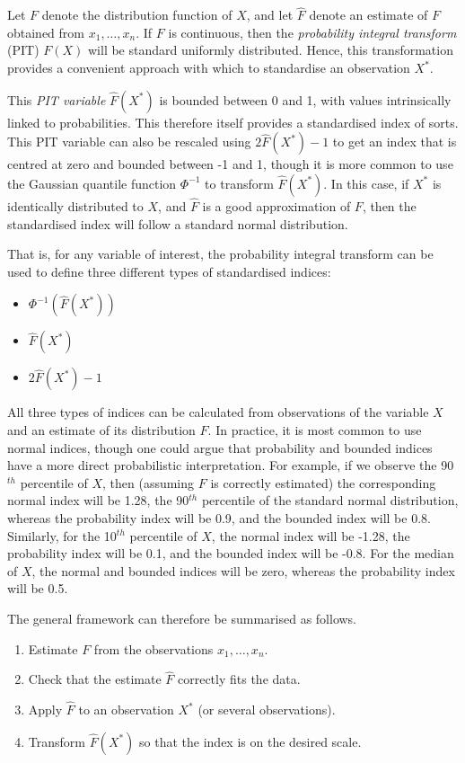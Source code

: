 \documentclass[article,shortnames,nojss]{jss}\usepackage[]{graphicx}\usepackage[]{xcolor}
\begin{document}
Let $F$ denote the distribution function of $X$, and let $\hat{F}$ denote an estimate of $F$ obtained from $x_{1}, \dots, x_{n}$. If $F$ is continuous, then the \emph{probability integral transform} (PIT) $F(X)$ will be standard uniformly distributed. Hence, this transformation provides a convenient approach with which to standardise an observation $X^{*}$.

This \emph{PIT variable} $\hat{F}(X^{*})$ is bounded between 0 and 1, with values intrinsically linked to probabilities. This therefore itself provides a standardised index of sorts. This PIT variable can also be rescaled using $2\hat{F}(X^{*}) - 1$ to get an index that is centred at zero and bounded between -1 and 1, though it is more common to use the Gaussian quantile function $\Phi^{-1}$ to transform $\hat{F}(X^{*})$. In this case, if $X^{*}$ is identically distributed to $X$, and $\hat{F}$ is a good approximation of $F$, then the standardised index will follow a standard normal distribution.

That is, for any variable of interest, the probability integral transform can be used to define three different types of standardised indices:
\begin{itemize}
  \item {} $\Phi^{-1}(\hat{F}(X^{*}))$
  \item {} $\hat{F}(X^{*})$
  \item {} $2\hat{F}(X^{*}) - 1$
\end{itemize}

All three types of indices can be calculated from observations of the variable $X$ and an estimate of its distribution $F$. In practice, it is most common to use normal indices, though one could argue that probability and bounded indices have a more direct probabilistic interpretation. For example, if we observe the 90$^{th}$ percentile of $X$, then (assuming $F$ is correctly estimated) the corresponding normal index will be 1.28, the 90$^{th}$ percentile of the standard normal distribution, whereas the probability index will be 0.9, and the bounded index will be 0.8. Similarly, for the 10$^{th}$ percentile of $X$, the normal index will be -1.28, the probability index will be 0.1, and the bounded index will be -0.8. For the median of $X$, the normal and bounded indices will be zero, whereas the probability index will be 0.5.

The general framework can therefore be summarised as follows.
\begin{enumerate}
  \item Estimate $F$ from the observations $x_{1}, \dots, x_{n}$.
  \item Check that the estimate $\hat{F}$ correctly fits the data.
  \item Apply $\hat{F}$ to an observation $X^{*}$ (or several observations).
  \item Transform $\hat{F}(X^{*})$ so that the index is on the desired scale.
\end{enumerate}
\end{document}
